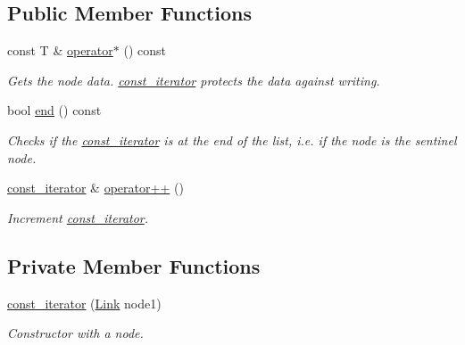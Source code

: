 \subsection*{Public Member Functions}
\begin{DoxyCompactItemize}
\item 
\hypertarget{classofeli_1_1list_1_1const__iterator_a2d0a1de571a02588a0dee230dc1534d2}{const T \& \hyperlink{classofeli_1_1list_1_1const__iterator_a2d0a1de571a02588a0dee230dc1534d2}{operator$\ast$} () const }\label{classofeli_1_1list_1_1const__iterator_a2d0a1de571a02588a0dee230dc1534d2}

\begin{DoxyCompactList}\small\item\em Gets the node data. {\itshape \hyperlink{classofeli_1_1list_1_1const__iterator}{const\-\_\-iterator}} protects the data against writing. \end{DoxyCompactList}\item 
\hypertarget{classofeli_1_1list_1_1const__iterator_aa79779e28253e61c8d1816f577de4ffd}{bool \hyperlink{classofeli_1_1list_1_1const__iterator_aa79779e28253e61c8d1816f577de4ffd}{end} () const }\label{classofeli_1_1list_1_1const__iterator_aa79779e28253e61c8d1816f577de4ffd}

\begin{DoxyCompactList}\small\item\em Checks if the {\itshape \hyperlink{classofeli_1_1list_1_1const__iterator}{const\-\_\-iterator}} is at the end of the list, i.\-e. if the node is the sentinel node. \end{DoxyCompactList}\item 
\hypertarget{classofeli_1_1list_1_1const__iterator_a31e40395e411104489e4235b775869ec}{\hyperlink{classofeli_1_1list_1_1const__iterator}{const\-\_\-iterator} \& \hyperlink{classofeli_1_1list_1_1const__iterator_a31e40395e411104489e4235b775869ec}{operator++} ()}\label{classofeli_1_1list_1_1const__iterator_a31e40395e411104489e4235b775869ec}

\begin{DoxyCompactList}\small\item\em Increment {\itshape \hyperlink{classofeli_1_1list_1_1const__iterator}{const\-\_\-iterator}}. \end{DoxyCompactList}\end{DoxyCompactItemize}
\subsection*{Private Member Functions}
\begin{DoxyCompactItemize}
\item 
\hypertarget{classofeli_1_1list_1_1const__iterator_a42996141faaf25e061ecf726a66c141b}{\hyperlink{classofeli_1_1list_1_1const__iterator_a42996141faaf25e061ecf726a66c141b}{const\-\_\-iterator} (\hyperlink{classofeli_1_1list_a7765ecb875543506d04dbd466f754503}{Link} node1)}\label{classofeli_1_1list_1_1const__iterator_a42996141faaf25e061ecf726a66c141b}

\begin{DoxyCompactList}\small\item\em Constructor with a node. \end{DoxyCompactList}\end{DoxyCompactItemize}

